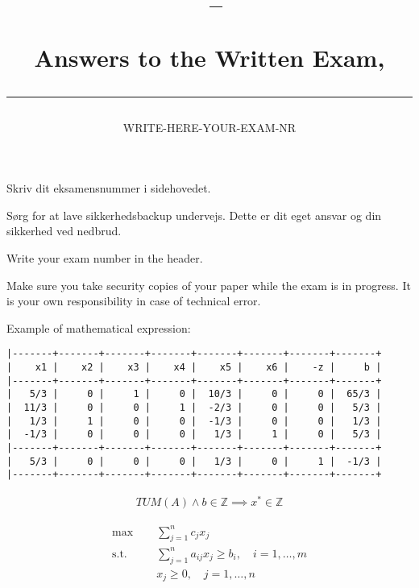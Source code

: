 \documentclass[a4paper,10pt]{article}
\author{WRITE-HERE-YOUR-EXAM-NR}
\title{\begin{flushleft}
\vspace{-4ex}
\courseid~-- \coursename \\[0.2cm]
{\Large Answers to the Written Exam, \term \\[3ex]
\hrule}
\end{flushleft}
}
\date{}
\begin{document}
\maketitle



Skriv dit eksamensnummer i sidehovedet.

Sørg for at lave sikkerhedsbackup undervejs. Dette er dit eget ansvar og
din sikkerhed ved nedbrud.


\bigskip

Write your exam number in the header.

Make sure you take security copies of your paper while the exam is in
progress. It is your own responsibility in case of technical error.

\bigskip

Example of mathematical expression:

\begin{lstlisting}[frame=none]
|-------+-------+-------+-------+-------+-------+-------+-------+
|    x1 |    x2 |    x3 |    x4 |    x5 |    x6 |    -z |     b |
|-------+-------+-------+-------+-------+-------+-------+-------+
|   5/3 |     0 |     1 |     0 |  10/3 |     0 |     0 |  65/3 |
|  11/3 |     0 |     0 |     1 |  -2/3 |     0 |     0 |   5/3 |
|   1/3 |     1 |     0 |     0 |  -1/3 |     0 |     0 |   1/3 |
|  -1/3 |     0 |     0 |     0 |   1/3 |     1 |     0 |   5/3 |
|-------+-------+-------+-------+-------+-------+-------+-------+
|   5/3 |     0 |     0 |     0 |   1/3 |     0 |     1 |  -1/3 |
|-------+-------+-------+-------+-------+-------+-------+-------+

\end{lstlisting}
\begin{align}
TUM(A) \wedge b \in \mathbb{Z} \implies x^* \in \mathbb{Z}
\end{align}

\begin{align}
\label{ob} \max \; \quad & \sum_{j=1}^nc_jx_j  \\
\label{c1} \mbox{s.t.} \quad &\sum\limits_{j=1}^n a_{ij}x_j\geq b_i,
\quad i=1,\ldots,m \\
\label{c2}   &x_j \geq 0, \quad j=1,\ldots,n   
\end{align}
\end{document}
